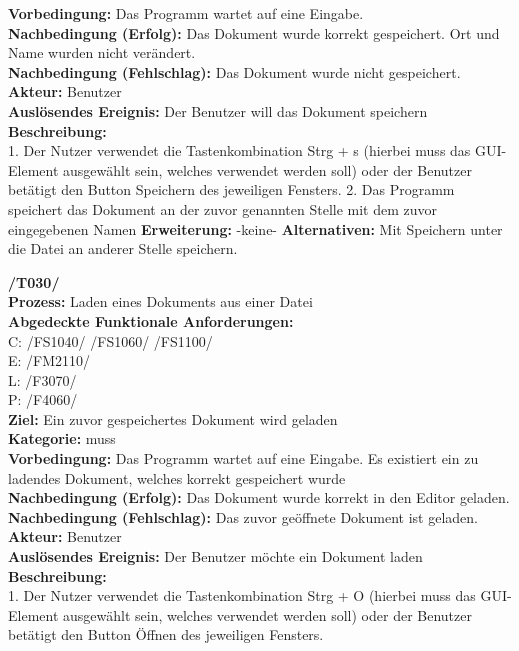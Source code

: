 \documentclass[a4paper]{scrreprt}
\begin{document}
\begin{addmargin}[15pt]{0pt}
\textbf{Vorbedingung:} Das Programm wartet auf eine Eingabe.\\
\textbf{Nachbedingung (Erfolg):} Das Dokument wurde korrekt gespeichert. Ort und Name wurden nicht verändert.\\
\textbf{Nachbedingung (Fehlschlag):} Das Dokument wurde nicht gespeichert. \\
\textbf{Akteur:} Benutzer\\
\textbf{Auslösendes Ereignis:} Der Benutzer will das Dokument speichern\\
\textbf{Beschreibung:} \\
1. Der Nutzer verwendet die Tastenkombination Strg + s (hierbei muss das GUI-Element ausgewählt sein, welches verwendet werden soll) oder der Benutzer betätigt den Button Speichern des jeweiligen Fensters.
2. Das Programm speichert das Dokument an der zuvor genannten Stelle mit dem zuvor eingegebenen Namen
\textbf {Erweiterung:} -keine-
\textbf {Alternativen:} Mit Speichern unter die Datei an anderer Stelle speichern. \\
\end{addmargin}
\textbf{/T030/} \\
\textbf{Prozess: }Laden eines Dokuments aus einer Datei \\
\textbf{Abgedeckte Funktionale Anforderungen:} \\
C: /FS1040/ /FS1060/ /FS1100/\\
E: /FM2110/	\\
L: /F3070/ \\
P: /F4060/\\
\textbf{Ziel:} Ein zuvor gespeichertes Dokument wird geladen\\
\textbf{Kategorie:} muss\\
\textbf{Vorbedingung:} Das Programm wartet auf eine Eingabe. Es existiert ein zu ladendes Dokument, welches korrekt gespeichert wurde\\
\textbf{Nachbedingung (Erfolg):} Das Dokument wurde korrekt in den Editor geladen. \\
\textbf{Nachbedingung (Fehlschlag):} Das zuvor geöffnete Dokument ist geladen. \\ 
\textbf{Akteur:} Benutzer\\
\textbf{Auslösendes Ereignis:} Der Benutzer möchte ein Dokument laden \\
\textbf{Beschreibung:} \\
1. Der Nutzer verwendet die Tastenkombination Strg + O (hierbei muss das GUI-Element ausgewählt sein, welches verwendet werden soll) oder der Benutzer betätigt den Button Öffnen des jeweiligen Fensters. \\
\end{document}
